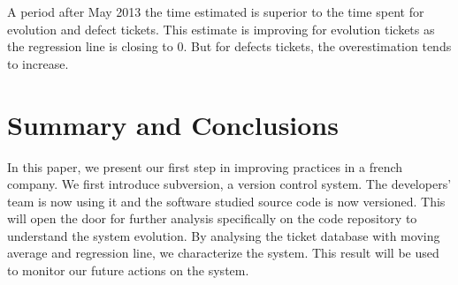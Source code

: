 \documentclass[10pt,conference]{IEEEtran}
\begin{document}
 A period after May 2013 the time estimated is superior to the time spent for evolution and defect tickets. 
 This estimate is improving for evolution tickets as the regression line is closing to 0.
But for defects tickets, the overestimation tends to increase.



\section{Summary and Conclusions}
\label{sec:conclusion}

In this paper, we present our first step in improving practices in a french company. We first introduce subversion, a version control system.
The developers' team is now using it and the software studied source code is now versioned.
This will open the door for further analysis specifically on the code repository to understand the system evolution. 
By analysing the ticket database with  moving average and regression line, we  characterize the system.
 This result will be used to monitor our future actions on the system.

%


\vspace{12pt}
\end{document}
